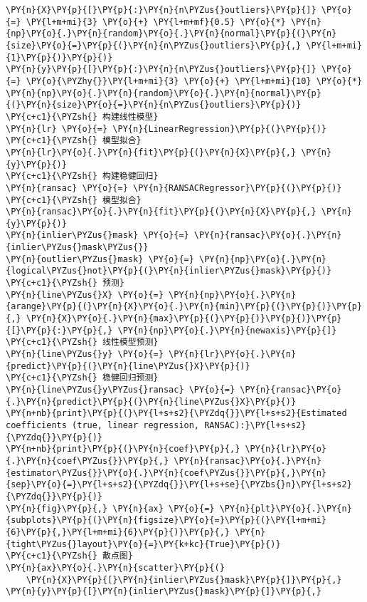 \begin{Verbatim}[commandchars=\\\{\}]
\PY{n}{X}\PY{p}{[}\PY{p}{:}\PY{n}{n\PYZus{}outliers}\PY{p}{]} \PY{o}{=} \PY{l+m+mi}{3} \PY{o}{+} \PY{l+m+mf}{0.5} \PY{o}{*} \PY{n}{np}\PY{o}{.}\PY{n}{random}\PY{o}{.}\PY{n}{normal}\PY{p}{(}\PY{n}{size}\PY{o}{=}\PY{p}{(}\PY{n}{n\PYZus{}outliers}\PY{p}{,} \PY{l+m+mi}{1}\PY{p}{)}\PY{p}{)}
\PY{n}{y}\PY{p}{[}\PY{p}{:}\PY{n}{n\PYZus{}outliers}\PY{p}{]} \PY{o}{=} \PY{o}{\PYZhy{}}\PY{l+m+mi}{3} \PY{o}{+} \PY{l+m+mi}{10} \PY{o}{*} \PY{n}{np}\PY{o}{.}\PY{n}{random}\PY{o}{.}\PY{n}{normal}\PY{p}{(}\PY{n}{size}\PY{o}{=}\PY{n}{n\PYZus{}outliers}\PY{p}{)}
\PY{c+c1}{\PYZsh{} 构建线性模型}
\PY{n}{lr} \PY{o}{=} \PY{n}{LinearRegression}\PY{p}{(}\PY{p}{)}
\PY{c+c1}{\PYZsh{} 模型拟合}
\PY{n}{lr}\PY{o}{.}\PY{n}{fit}\PY{p}{(}\PY{n}{X}\PY{p}{,} \PY{n}{y}\PY{p}{)}
\PY{c+c1}{\PYZsh{} 构建稳健回归}
\PY{n}{ransac} \PY{o}{=} \PY{n}{RANSACRegressor}\PY{p}{(}\PY{p}{)}
\PY{c+c1}{\PYZsh{} 模型拟合}
\PY{n}{ransac}\PY{o}{.}\PY{n}{fit}\PY{p}{(}\PY{n}{X}\PY{p}{,} \PY{n}{y}\PY{p}{)}
\PY{n}{inlier\PYZus{}mask} \PY{o}{=} \PY{n}{ransac}\PY{o}{.}\PY{n}{inlier\PYZus{}mask\PYZus{}}
\PY{n}{outlier\PYZus{}mask} \PY{o}{=} \PY{n}{np}\PY{o}{.}\PY{n}{logical\PYZus{}not}\PY{p}{(}\PY{n}{inlier\PYZus{}mask}\PY{p}{)}
\PY{c+c1}{\PYZsh{} 预测}
\PY{n}{line\PYZus{}X} \PY{o}{=} \PY{n}{np}\PY{o}{.}\PY{n}{arange}\PY{p}{(}\PY{n}{X}\PY{o}{.}\PY{n}{min}\PY{p}{(}\PY{p}{)}\PY{p}{,} \PY{n}{X}\PY{o}{.}\PY{n}{max}\PY{p}{(}\PY{p}{)}\PY{p}{)}\PY{p}{[}\PY{p}{:}\PY{p}{,} \PY{n}{np}\PY{o}{.}\PY{n}{newaxis}\PY{p}{]}
\PY{c+c1}{\PYZsh{} 线性模型预测}
\PY{n}{line\PYZus{}y} \PY{o}{=} \PY{n}{lr}\PY{o}{.}\PY{n}{predict}\PY{p}{(}\PY{n}{line\PYZus{}X}\PY{p}{)}
\PY{c+c1}{\PYZsh{} 稳健回归预测}
\PY{n}{line\PYZus{}y\PYZus{}ransac} \PY{o}{=} \PY{n}{ransac}\PY{o}{.}\PY{n}{predict}\PY{p}{(}\PY{n}{line\PYZus{}X}\PY{p}{)}
\PY{n+nb}{print}\PY{p}{(}\PY{l+s+s2}{\PYZdq{}}\PY{l+s+s2}{Estimated coefficients (true, linear regression, RANSAC):}\PY{l+s+s2}{\PYZdq{}}\PY{p}{)}
\PY{n+nb}{print}\PY{p}{(}\PY{n}{coef}\PY{p}{,} \PY{n}{lr}\PY{o}{.}\PY{n}{coef\PYZus{}}\PY{p}{,} \PY{n}{ransac}\PY{o}{.}\PY{n}{estimator\PYZus{}}\PY{o}{.}\PY{n}{coef\PYZus{}}\PY{p}{,}\PY{n}{sep}\PY{o}{=}\PY{l+s+s2}{\PYZdq{}}\PY{l+s+se}{\PYZbs{}n}\PY{l+s+s2}{\PYZdq{}}\PY{p}{)}
\PY{n}{fig}\PY{p}{,} \PY{n}{ax} \PY{o}{=} \PY{n}{plt}\PY{o}{.}\PY{n}{subplots}\PY{p}{(}\PY{n}{figsize}\PY{o}{=}\PY{p}{(}\PY{l+m+mi}{6}\PY{p}{,}\PY{l+m+mi}{6}\PY{p}{)}\PY{p}{,} \PY{n}{tight\PYZus{}layout}\PY{o}{=}\PY{k+kc}{True}\PY{p}{)}
\PY{c+c1}{\PYZsh{} 散点图}
\PY{n}{ax}\PY{o}{.}\PY{n}{scatter}\PY{p}{(}
    \PY{n}{X}\PY{p}{[}\PY{n}{inlier\PYZus{}mask}\PY{p}{]}\PY{p}{,} \PY{n}{y}\PY{p}{[}\PY{n}{inlier\PYZus{}mask}\PY{p}{]}\PY{p}{,} 

\end{Verbatim}
